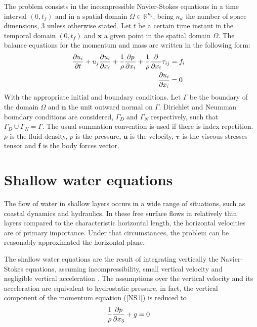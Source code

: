 The problem consists in the incompressible Navier-Stokes equations in a time interval $(0, t_f)$ and in a spatial domain $\Omega \in \mathbb{R}^{n_d}$, being $n_d$ the number of space dimensions, $3$ unless otherwise stated. Let $t$ be a certain time instant in the temporal domain $(0, t_f)$ and $\mathbf{x}$ a given point in the spatial domain $\Omega$. The balance equations for the momentum and mass are written in the following form:
\begin{subequations} \label{NS}
    \begin{align} \label{NS1}
        \frac{\partial u_i}{\partial t} + u_j \frac{\partial u_i}{\partial x_i} + \frac{1}{\rho} \frac{\partial p}{\partial x_i} +
            \frac{1}{\rho} \frac{\partial}{\partial x_i} \tau_{ij} &= f_i \\ \label{NS2}
        \frac{\partial u_i}{\partial x_i} &= 0
    \end{align}
\end{subequations}
With the appropriate initial and boundary conditions. Let $\Gamma$ be the boundary of the domain $\Omega$ and $\mathbf{n}$ the unit outward normal on $\Gamma$. Dirichlet and Neumman boundary conditions are considered, $\Gamma_D$ and $\Gamma_N$ respectively, such that $\Gamma_D \cup \Gamma_N = \Gamma$.
The usual summation convention is used if there is index repetition.
$\rho$ is the fluid density, $p$ is the pressure, $\mathbf{u}$ is the velocity, $\bm{\tau}$ is the viscous stresses tensor and $\mathbf{f}$ is the body forces vector.



\section{Shallow water equations}


The flow of water in shallow layers occurs in a wide range of situations, such as coastal dynamics and hydraulics. In these free surface flows in relatively thin layers compared to the characteristic horizontal length, the horizontal velocities are of primary importance. Under that circumstances, the problem can be reasonably approximated the horizontal plane.

The shallow water equations are the result of integrating vertically the Navier-Stokes equations, assuming incompressibility, small vertical velocity and negligible vertical acceleration \cite{abbot1979,zien3}. The assumptions over the vertical velocity and its acceleration are equivalent to hydrostatic pressure, in fact, the vertical component of the momentum equation (\ref{NS1}) is reduced to
\begin{equation} \label{SW_hydrostatic_pressure}
    \frac{1}{\rho}\frac{\partial p}{\partial x_3} + g = 0
\end{equation}

